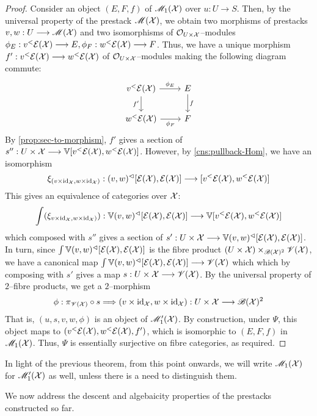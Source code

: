 \documentclass[11pt]{amsart}
\begin{document}
\begin{proof}
Consider an object $(E, F, f)$ of $\mathscr{M}_1(\mathcal{X})$ over $u : U \to S$.
Then, by the universal property
of the prestack $\mathscr{M}(\mathcal{X})$, we obtain two morphisms of prestacks
$v, w : U \to \sM(\mcX)$ and two isomorphisms of $\mathcal{O}_{U \times \mathcal{X}}$--modules
$\phi_E : v^<\mcE(\mcX) \to E, \phi_F : w^<\mcE(\mcX) \to F$. Thus, we have a
unique morphism $f' : v^<\mcE(\mcX) \to w^<\mcE(\mcX)$ of
$\mathcal{O}_{U \times \mathcal{X}}$--modules making the following diagram commute:
\[\begin{tikzcd}
v^<\mcE(\mcX) \ar[r, "\phi_E"] \ar[d, "f'" left] & E \ar[d, "f"] \\
w^<\mcE(\mcX) \ar[r, "\phi_F" below] & F
\end{tikzcd}\]
By \cref{prop:sec-to-morphism}, $f'$ gives a section of
$s'' : U \times \mcX \to \bV[v^<\mcE(\mcX), w^<\mcE(\mcX)]$.
However, by \cref{cns:pullback-Hom}, we have an isomorphism
\[
\xi_{(v \times \id_\mcX, w \times \id_\mcX)} :
(v, w)^\lhd[\mcE(\mcX), \mcE(\mcX)] \to[] [v^<\mcE(\mcX), w^<\mcE(\mcX)]
\]
This gives an equivalence of categories over $\mathcal{X}$:
\[
\int (\xi_{v \times \id_\mcX, w \times \id_\mcX)}):
\bV(v, w)^\lhd[\mcE(\mcX), \mcE(\mcX)] \to[] \bV[v^<\mcE(\mcX), w^<\mcE(\mcX)]
\]
which composed with $s''$ gives a section of
$s' : U \times \mcX \to \bV(v, w)^\lhd[\mcE(\mcX), \mcE(\mcX)]$.
In turn, since $\int \mathbb{V}(v, w)^\lhd[\mathcal{E}(\mathcal{X}), \mathcal{E}(\mathcal{X})]$
is the fibre product $(U \times \mathcal{X}) \times_{\mathscr{B}(\mathcal{X})^2} \mathscr{V}(\mathcal{X})$,
we have a canonical map
$\int \bV(v, w)^\lhd[\mcE(\mcX), \mcE(\mcX)] \to \sV(\mcX)$ which which by
composing with $s'$ gives a map $s : U \times \mcX \to \sV(\mcX)$. By
the universal property of $2$--fibre products, we get a $2$--morphism
\[
\phi : \pi_{\sV(\mcX)} \circ s \To (v \times \id_\mcX, w \times \id_\mcX)
: U \times \mcX \to \sB(\mcX)^2
\]
That is, $(u, s, v, w, \phi)$ is an object of $\mathscr{M}_1'(\mathcal{X})$. By construction,
under $\Psi$, this object maps to
$(v^<\mathcal{E}(\mathcal{X}), w^<\mathcal{E}(\mathcal{X}), f')$, which is isomorphic
to $(E, F, f)$ in $\mathscr{M}_1(\mathcal{X})$. Thus, $\Psi$ is essentially surjective on
fibre categories, as required.
\end{proof}

\begin{notn}
In light of the previous theorem, from this point onwards,
we will write $\mathscr{M}_1(\mathcal{X})$ for $\mathscr{M}_1'(\mathcal{X})$ as well, unless there is a need
to distinguish them.
\end{notn}

We now address the descent and algebaicity properties of the prestacks
constructed so far.
\end{document}

